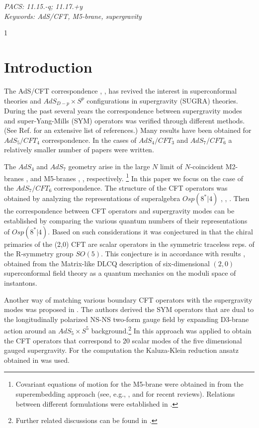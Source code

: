 \documentclass[a4paper,11pt]{article}
\begin{document}
\vspace{3cm} {\it PACS: 11.15.-q; 11.17.+y}\\ {\it Keywords:
AdS/CFT, M5-brane, supergravity}


\renewcommand{\thefootnote}{\arabic{footnote}}
\setcounter{page}1




\newpage
\section{Introduction}

The AdS/CFT correspondence \cite{jm}, \cite{gkp}, \cite{witten}
has revived the interest in superconformal theories and
$AdS_{D-p}\times S^p$ configurations in supergravity (SUGRA)
theories. During the past several years the correspondence between
supergravity modes and super-Yang-Mills (SYM) operators was
verified through different methods. (See Ref. \cite{agmoo} for
an extensive list of references.) Many results have been obtained
for $AdS_5/CFT_4$ correspondence. In the cases of $AdS_4/CFT_3$
and $AdS_7/CFT_6$ a relatively smaller number of papers were
written.

The $AdS_4$ and $AdS_7$ geometry arise \cite{gt} in the large $N$
limit of $N$-coincident M2-branes \cite{bst}, \cite{bst1} and
M5-branes \cite{pst}, \cite{blnpst}, \cite{apps} respectively.
\footnote{Covariant equations of motion for the M5-brane were
obtained in \cite{sezgin} from the superembedding approach (see,
e.g., \cite{bpstv}, and \cite{embed} for recent reviews).
Relations between different formulations were established in
\cite{blnpst1}.} In this paper we focus on the case of the
$AdS_7/CFT_6$ correspondence. The structure of the CFT operators
was obtained by analyzing the representations of superalgebra
$Osp(8^*|4)$ \cite{minwalla}, \cite{aoy}, \cite{lr}. Then the
correspondence between CFT operators and supergravity modes can be
established by comparing the various quantum numbers of their
representations of $Osp(8^*|4)$.  Based on such considerations it
was conjectured in \cite{minwalla1} that the chiral primaries of
the (2,0) CFT are scalar operators in the symmetric traceless
reps. of the R-symmetry group $SO(5)$. This conjecture is in
accordance with results \cite{seiberg}, \cite{abs} obtained from
the Matrix-like DLCQ description of six-dimensional $(2,0)$
superconformal field theory as a quantum mechanics on the moduli
space of instantons.

Another way of matching various boundary CFT operators with the
supergravity modes was proposed in \cite{das}. The authors derived
the SYM operators that are dual to the longitudinally polarized
NS-NS two-form gauge field by expanding D3-brane action around an
$AdS_5\times S^5$ background.\footnote{Further related discussions
can be found in \cite{iyp,dt2,rr}.} In \cite{tran} this approach
was applied to obtain the CFT operators that correspond to 20
scalar modes of the five dimensional gauged supergravity. For the
computation the Kaluza-Klein reduction \cite{nieuw0,dnp} ansatz
obtained in \cite{clpst} was used.
\end{document}
